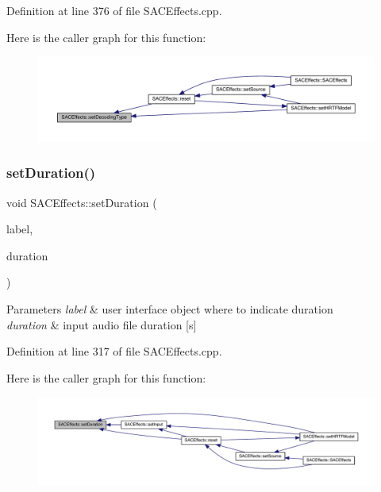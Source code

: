 Definition at line 376 of file S\+A\+C\+Effects.\+cpp.

Here is the caller graph for this function\+:
\nopagebreak
\begin{figure}[H]
\begin{center}
\leavevmode
\includegraphics[width=350pt]{class_s_a_c_effects_a07d9b0135f5811a7b6e2d5d98c26fafe_icgraph}
\end{center}
\end{figure}
\mbox{\label{class_s_a_c_effects_a69e964cefe25c40e7852cf7baeda28fd}} 
\subsubsection{\texorpdfstring{set\+Duration()}{setDuration()}}
{\footnotesize\ttfamily void S\+A\+C\+Effects\+::set\+Duration (\begin{DoxyParamCaption}\item[{Q\+Label $\ast$}]{label,  }\item[{double}]{duration }\end{DoxyParamCaption})}


\begin{DoxyParams}{Parameters}
{\em label} & user interface object where to indicate duration \\
\hline
{\em duration} & input audio file duration \mbox{[}s\mbox{]} \\
\hline
\end{DoxyParams}


Definition at line 317 of file S\+A\+C\+Effects.\+cpp.

Here is the caller graph for this function\+:
\nopagebreak
\begin{figure}[H]
\begin{center}
\leavevmode
\includegraphics[width=350pt]{class_s_a_c_effects_a69e964cefe25c40e7852cf7baeda28fd_icgraph}
\end{center}
\end{figure}
\mbox{\label{class_s_a_c_effects_ab57fa3b5c11bafba4c2e471a80964c14}} 
